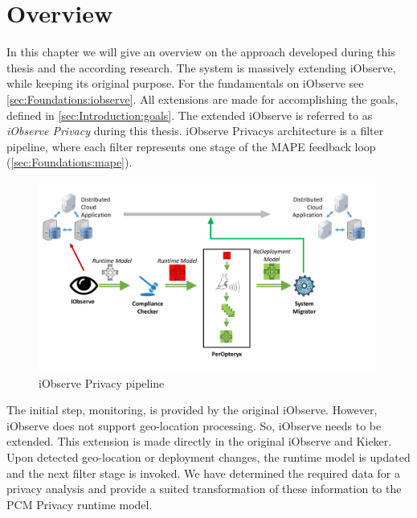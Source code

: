 
\chapter{Overview}
\label{ch:Overview}

In this chapter we will give an overview on the approach developed during this thesis and the according research. The system is massively extending iObserve, while keeping its original purpose. For the fundamentals on iObserve see \autoref{sec:Foundations:iobserve}. All extensions are made for accomplishing the goals, defined in \autoref{sec:Introduction:goals}. The extended iObserve is referred to as \textit{iObserve Privacy} during this thesis. iObserve Privacys architecture is a filter pipeline, where each filter represents one stage of the MAPE feedback loop (\autoref{sec:Foundations:mape}).


\begin{figure}[h]
	\centering
	\includegraphics[width=0.99\textwidth]{pictures/pipeline}
	\caption{iObserve Privacy pipeline}
	\label{fig:pipeline}
\end{figure}

The initial step, monitoring, is provided by the original iObserve. However, iObserve does not support geo-location processing. So, iObserve needs to be extended. This extension is made directly in the original iObserve and Kieker. Upon detected geo-location or deployment changes, the runtime model is updated and the next filter stage is invoked. We have determined the required data for a privacy analysis and provide a suited transformation of these information to the PCM Privacy runtime model.

